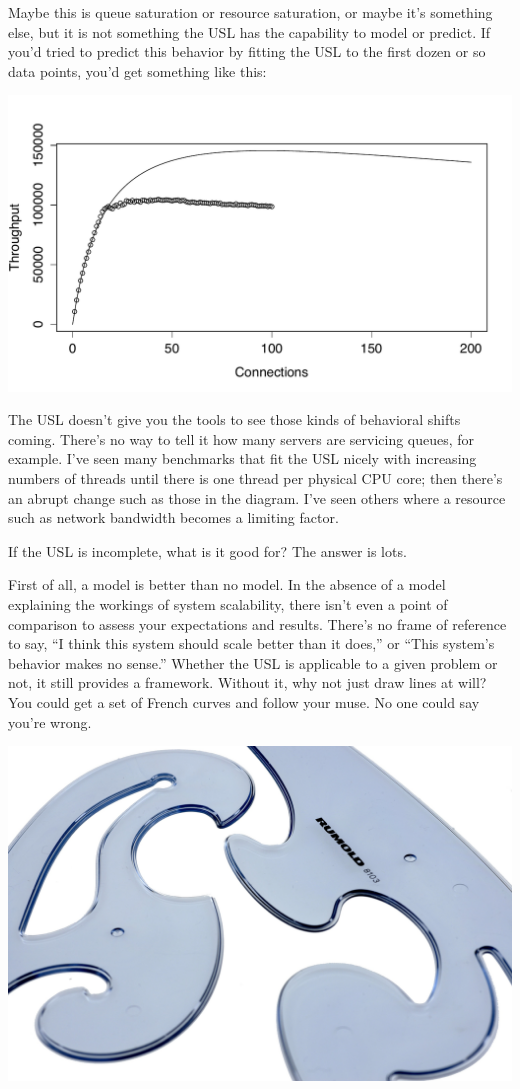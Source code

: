 \documentclass{vivid_layout}
\begin{document}
Maybe this is queue saturation or resource saturation, or maybe it's something
else, but it is not something the USL has the capability to model or predict. If
you'd tried to predict this behavior by fitting the USL to the first dozen or so
data points, you'd get something like this:
\begin{center}
\includegraphics[width=.85\linewidth]{scalability/handlersocket-2}
\end{center}

The USL doesn't give you the tools to see those kinds of behavioral shifts
coming. There's no way to tell it how many servers are servicing queues, for
example. I've seen many benchmarks that fit the USL nicely with increasing
numbers of threads until there is one thread per physical CPU core; then there's
an abrupt change such as those in the diagram. I've seen others where a resource
such as network bandwidth becomes a limiting factor.

If the USL is incomplete, what is it good for? The answer is lots.

First of all, a model is better than no model. In the absence of a model
explaining the workings of system scalability, there isn't even a point of
comparison to assess your expectations and results. There's no frame of
reference to say, ``I think this system should scale better than it does,'' or
``This system's behavior makes no sense.'' Whether the USL is applicable to a
given problem or not, it still provides a framework. Without it, why not just
draw lines at will? You could get a set of French curves and follow your muse.
No one could say you're wrong.
\begin{center}
\includegraphics[width=.85\linewidth,trim={0 8cm 0 0},clip]{scalability/french_curve}
\end{center}
\end{document}
